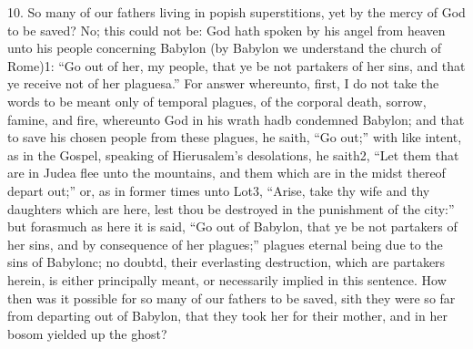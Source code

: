 10. So many of our fathers living in popish superstitions, yet by the mercy of God to be saved? No; this could not be: God hath spoken by his angel from heaven unto his people concerning Babylon (by Babylon we understand the church of Rome)1: “Go out of her, my people, that ye be not partakers of her sins, and that ye receive not of her plaguesa.” For answer whereunto, first, I do not take the words to be meant only of temporal plagues, of the corporal death, sorrow, famine, and fire, whereunto God in his wrath hadb condemned Babylon; and that to save his chosen people from these plagues, he saith, “Go out;” with like intent, as in the Gospel, speaking of Hierusalem’s desolations, he saith2, “Let them that are in Judea flee unto the mountains, and them which are in the midst thereof depart out;” or, as in former times unto Lot3, “Arise, take thy wife and thy daughters which are here, lest thou be destroyed in the punishment of the city:” but forasmuch as here it is said, “Go out of Babylon, that ye be not partakers of her sins, and by consequence of her plagues;” plagues eternal being due to the sins of Babylonc; no doubtd, their everlasting destruction, which are partakers herein, is either principally meant, or necessarily implied in this sentence. How then was it possible for so many of our fathers to be saved, sith they were so far from departing out of Babylon, that they took her for their mother, and in her bosom yielded up the ghost?

